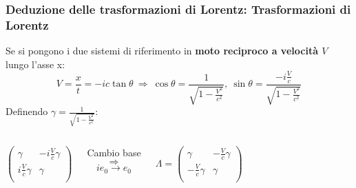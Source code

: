 \documentclass{beamer}
\begin{document}
\begin{frame}
    \frametitle{Deduzione delle trasformazioni di Lorentz: Trasformazioni di Lorentz}
    Se si pongono i due sistemi di riferimento in \textbf{moto reciproco a velocità $V$} lungo l'asse x: $$V=\frac{x}{t}=-ic\tan\theta\ \Rightarrow\ \cos\theta=\frac{1}{\sqrt{1-\frac{V^2}{c^2}}},\ \sin\theta=\frac{-i\frac{V}{c}}{\sqrt{1-\frac{V^2}{c^2}}}$$
    Definendo $\gamma=\frac{1}{\sqrt{1-\frac{V^2}{c^2}}}$:
    \begin{columns}
        \begin{equation*}
            \begin{pmatrix}
                \gamma&-i\frac{V}{c}\gamma\\i\frac{V}{c}\gamma&\gamma\\
            \end{pmatrix}
        \end{equation*}
        \begin{center}
             Cambio base 
        $$\Longrightarrow$$
        $$ie_0\rightarrow e_0$$
        \end{center}
       
        \begin{equation*}\boxed{
            \Lambda=\begin{pmatrix}
            \gamma&-\frac{V}{c}\gamma\\-\frac{V}{c}\gamma&\gamma\\
        \end{pmatrix}}
    \end{equation*}
    \end{columns}    
\end{frame}
\end{document}
